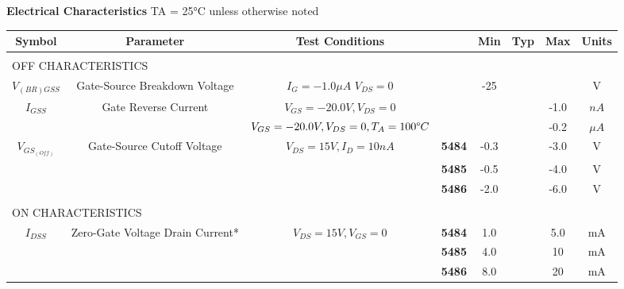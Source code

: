 \textbf{\large Electrical Characteristics }\tiny{TA = 25°C unless otherwise noted}
\begin{center}
  \begin{tabular}{ c | c | c  c | c | c | c | c }
    \hline
      \textbf{Symbol} &
      \textbf{Parameter} &
      \textbf{Test Conditions} & &
      \textbf{Min} &
      \textbf{Typ} &
      \textbf{Max} &
      \textbf{Units}
    \\
    \hline
      \multicolumn{8}{l}{}\\
      \multicolumn{8}{l}{OFF CHARACTERISTICS}
    \\
    \hline
      $V_{(BR)GSS}$ &
      \tiny{Gate-Source Breakdown Voltage} &
      \tiny{$I_G = -1.0 \mu A$ $V_{DS} = 0$} &
      &
      -25 &
      &
      &
      V
    \\
    \hline
      $I_{GSS}$ &
      \tiny{Gate Reverse Current} &
      \tiny{$V_{GS} = -20.0 V, V_{DS} = 0$} &
      &
      &
      &
      -1.0&
      $nA$
    \\
      &
      &
      \tiny{$V_{GS} = -20.0 V, V_{DS} = 0, T_A = 100 \degree C$} &
      &
      &
      &
      -0.2&
      $\mu A$
    \\
    \hline
      $V_{GS_{(Off)}}$ &
      \tiny{Gate-Source Cutoff Voltage} &
      \tiny{$V_{DS} = 15 V, I_D = 10 nA$} &
      \tiny{\textbf{5484}}&
      -0.3&
      &
      -3.0&
      V
    \\
      &
      &
      &
      \tiny{\textbf{5485}}&
      -0.5&
      &
      -4.0&
      V
    \\
      &
      &
      &
      \tiny{\textbf{5486}}&
      -2.0&
      &
      -6.0&
      V
    \\
    \hline
      \multicolumn{8}{l}{}\\
      \multicolumn{8}{l}{ON CHARACTERISTICS}
    \\
    \hline
      $I_{DSS}$ &
      \tiny{Zero-Gate Voltage Drain Current*} &
      \tiny{$V_{DS} = 15 V, V_{GS} = 0$} &
      \tiny{\textbf{5484}}&
      1.0&
      &
      5.0&
      mA
    \\
      &
      &
      &
      \tiny{\textbf{5485}}&
      4.0&
      &
      10&
      mA
    \\
      &
      &
      &
      \tiny{\textbf{5486}}&
      8.0&
      &
      20&
      mA
    \\
    \hline
  \end{tabular}
\end{center}

